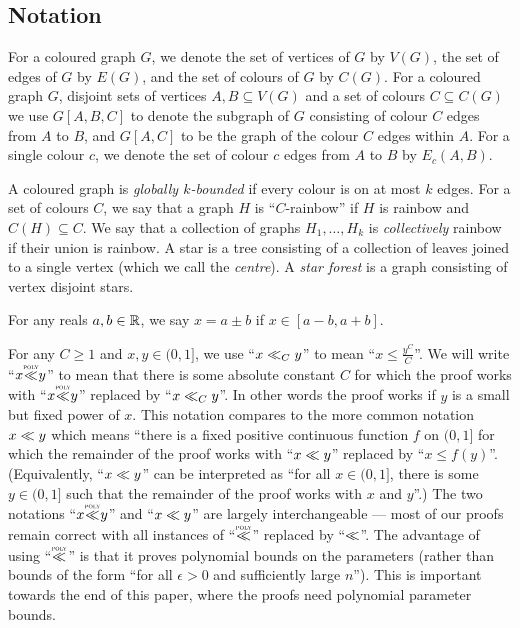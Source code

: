 



\subsection{Notation}\label{sec:not}
For a coloured graph $G$, we denote the set of vertices of $G$ by $V(G)$, the set of edges of $G$ by $E(G)$, and the set of colours of $G$ by $C(G)$.
For a coloured graph $G$, disjoint sets of vertices $A,B\subseteq V(G)$ and a set of colours $C\subseteq C(G)$ we use $G[A,B,C]$ to denote the subgraph of $G$ consisting of colour $C$ edges from $A$ to $B$, and $G[A,C]$ to be the graph of the colour $C$ edges within $A$.
For a single colour $c$, we denote the set of colour $c$ edges from $A$ to $B$ by $E_c(A,B)$.

A coloured graph is \emph{globally $k$-bounded} if every colour is on at most $k$ edges.
For a set of colours $C$, we say that a graph $H$ is ``$C$-rainbow''  if $H$ is rainbow and $C(H)\subseteq C$. We say that a collection of graphs $H_1, \dots, H_k$ is \emph{collectively} rainbow if their union is rainbow.
A star is a tree consisting of a collection of leaves joined to a single vertex (which we call the \emph{centre}).
A \emph{star forest} is a graph consisting of vertex disjoint stars.

For any reals $a,b\in \mathbb{R}$, we say $x=a\pm b$ if $x\in [a-b,a+b]$.



For any $C\geq 1$ and $x,y\in (0,1]$, we use ``$x\oldll_C y$'' to mean ``$x\leq \frac{y^C}{C}$''. We will write ``$x\LL y$'' to mean that there is some absolute constant $C$ for which the proof works with ``$x\LL{} y$'' replaced by ``$x\oldll_{C} y$''. 
In other words the proof works if $y$ is a small but fixed power of $x$.
This notation compares to the more common notation $x\oldll y$ which means ``there is a fixed positive continuous function $f$ on $(0,1]$ for which the remainder of the proof works with ``$x\oldll y$'' replaced by ``$x\leq f(y)$''. (Equivalently, ``$x\oldll y$'' can be interpreted as ``for all $x\in (0,1]$, there is some $y\in (0,1]$ such that the remainder of the proof works with $x$ and $y$''.) The two notations ``$x\LL{} y$'' and ``$x\oldll y$'' are largely interchangeable --- most of our proofs remain correct with all instances of ``$\LL$'' replaced by ``$\oldll$''. The advantage of using ``$\LL$'' is that it proves polynomial bounds on the parameters (rather than bounds of the form ``for all $\epsilon>0$ and  sufficiently large $n$''). This is important towards the end of this paper, where the proofs need polynomial parameter bounds.

